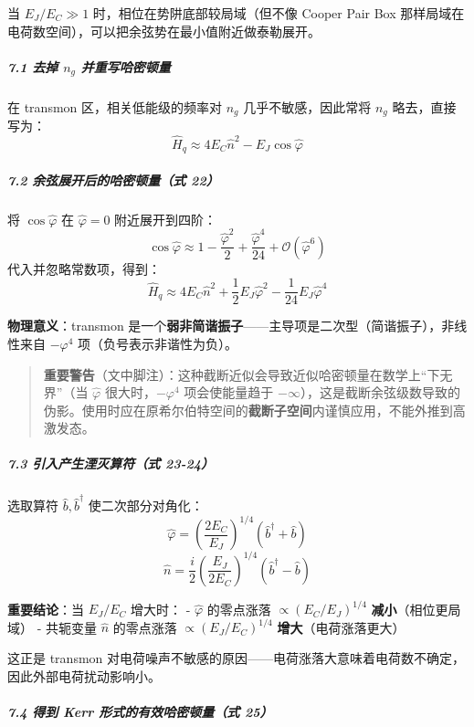 \documentclass[12pt,a4paper,oneside]{ctexbook}
\let\oldsubparagraph\subparagraph
\renewcommand{\subparagraph}[1]{\oldsubparagraph{#1}\mbox{}}
\begin{document}
当 \(E_J/E_C \gg 1\) 时，相位在势阱底部较局域（但不像 Cooper Pair Box
那样局域在电荷数空间），可以把余弦势在最小值附近做泰勒展开。

\subparagraph{\texorpdfstring{7.1 去掉 \(n_g\)
并重写哈密顿量}{7.1 去掉 n\_g 并重写哈密顿量}}\label{ux53bbux6389-n_g-ux5e76ux91cdux5199ux54c8ux5bc6ux987fux91cf}

在 transmon 区，相关低能级的频率对 \(n_g\) 几乎不敏感，因此常将 \(n_g\)
略去，直接写为： \[\hat H_q \approx 4E_C\hat n^2 - E_J\cos\hat\varphi\]

\subparagraph{7.2 余弦展开后的哈密顿量（式
22）}\label{ux4f59ux5f26ux5c55ux5f00ux540eux7684ux54c8ux5bc6ux987fux91cfux5f0f-22}

将 \(\cos\hat\varphi\) 在 \(\hat\varphi=0\) 附近展开到四阶：
\[\cos\hat\varphi \approx 1 - \frac{\hat\varphi^2}{2} + \frac{\hat\varphi^4}{24} + \mathcal{O}(\hat\varphi^6)\]
代入并忽略常数项，得到：
\[\hat H_q \approx 4E_C\hat n^2 + \frac{1}{2}E_J\hat\varphi^2 - \frac{1}{24}E_J\hat\varphi^4\]

\textbf{物理意义}：transmon
是一个\textbf{弱非简谐振子}------主导项是二次型（简谐振子），非线性来自
\(-\varphi^4\) 项（负号表示非谐性为负）。

\begin{quote}
\textbf{重要警告}（文中脚注）：这种截断近似会导致近似哈密顿量在数学上``下无界''（当
\(\hat\varphi\) 很大时，\(-\varphi^4\) 项会使能量趋于
\(-\infty\)），这是截断余弦级数导致的伪影。使用时应在原希尔伯特空间的\textbf{截断子空间}内谨慎应用，不能外推到高激发态。
\end{quote}

\subparagraph{7.3 引入产生湮灭算符（式
23-24）}\label{ux5f15ux5165ux4ea7ux751fux6e6eux706dux7b97ux7b26ux5f0f-23-24}

选取算符 \(\hat b, \hat b^\dagger\) 使二次部分对角化：
\[\hat\varphi = \left(\frac{2E_C}{E_J}\right)^{1/4}(\hat b^\dagger + \hat b)\]
\[\hat n = \frac{i}{2}\left(\frac{E_J}{2E_C}\right)^{1/4}(\hat b^\dagger - \hat b)\]

\textbf{重要结论}：当 \(E_J/E_C\) 增大时： - \(\hat\varphi\) 的零点涨落
\(\propto (E_C/E_J)^{1/4}\) \textbf{减小}（相位更局域） - 共轭变量
\(\hat n\) 的零点涨落 \(\propto (E_J/E_C)^{1/4}\)
\textbf{增大}（电荷涨落更大）

这正是 transmon
对电荷噪声不敏感的原因------电荷涨落大意味着电荷数不确定，因此外部电荷扰动影响小。

\subparagraph{7.4 得到 Kerr 形式的有效哈密顿量（式
25）}\label{ux5f97ux5230-kerr-ux5f62ux5f0fux7684ux6709ux6548ux54c8ux5bc6ux987fux91cfux5f0f-25}
\end{document}
